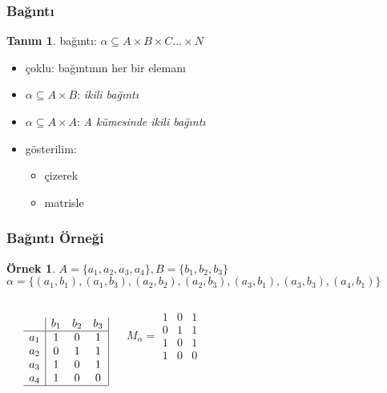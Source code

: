 \documentclass[dvipsnames]{beamer}
\theoremstyle{definition}
\newtheorem{tanim}[theorem]{Tanım}
\theoremstyle{example}
\newtheorem{ornek}[theorem]{Örnek}
\theoremstyle{plain}
\begin{document}
\begin{frame}
  \frametitle{Bağıntı}

  \begin{tanim}
    \alert{bağıntı}: $\alpha \subseteq A \times B \times C \dots \times N$
  \end{tanim}

  \pause
  \begin{itemize}
    \item \alert{çoklu}: bağıntının her bir elemanı

    \pause
    \medskip
    \item $\alpha \subseteq A \times B$: \emph{ikili bağıntı}
    \item $\alpha \subseteq A \times A$: \emph{A kümesinde ikili bağıntı}

    \pause
    \medskip
    \item gösterilim:
    \begin{itemize}
      \item çizerek
      \item matrisle
    \end{itemize}
  \end{itemize}
\end{frame}

\begin{frame}
  \frametitle{Bağıntı Örneği}

  \begin{ornek}
    $A=\{a_1,a_2,a_3,a_4\}, B=\{b_1,b_2,b_3\}$\\
    $\alpha = \{(a_1,b_1),(a_1,b_3),(a_2,b_2),(a_2,b_3),
                (a_3,b_1),(a_3,b_3),(a_4,b_1)\}$

    \pause
    \medskip
    \begin{columns}
      \begin{center}
      \end{center}

      \[ \begin{array}{c|ccc|}
              & b_1 & b_2 & b_3\\\hline
          a_1 &  1  &  0  &  1\\
          a_2 &  0  &  1  &  1\\
          a_3 &  1  &  0  &  1\\
          a_4 &  1  &  0  &  0\\\hline
        \end{array} \]

      \[ M_\alpha =
        \begin{array}{|ccc|}
          1 & 0 & 1\\
          0 & 1 & 1\\
          1 & 0 & 1\\
          1 & 0 & 0
        \end{array}
      \]
    \end{columns}
  \end{ornek}
\end{frame}
\end{document}

